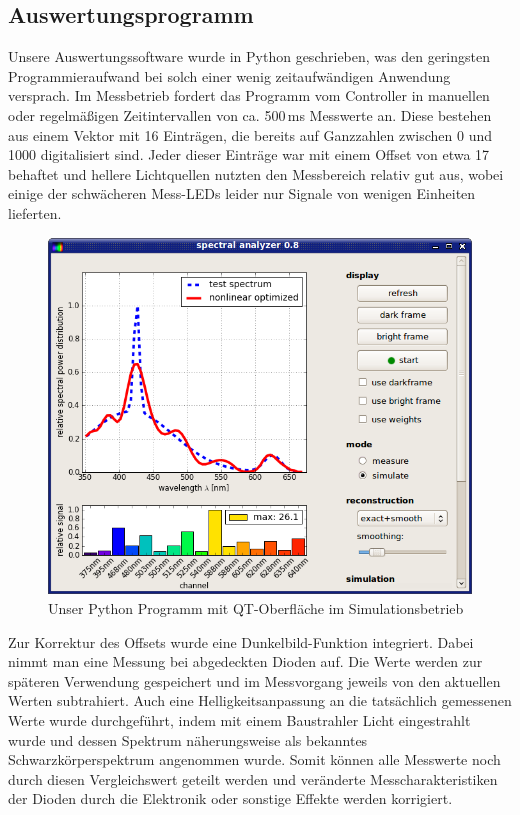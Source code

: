 \documentclass[11pt]{scrartcl}
\begin{document}
\subsection{Auswertungsprogramm} %
Unsere Auswertungssoftware wurde in Python geschrieben, was den geringsten Programmieraufwand bei solch einer wenig zeitaufwändigen Anwendung versprach.
Im Messbetrieb fordert das Programm vom Controller in manuellen oder regelmäßigen Zeitintervallen von ca. 500\,ms Messwerte an.
Diese bestehen aus einem Vektor mit 16 Einträgen, die bereits auf Ganzzahlen zwischen 0 und 1000 digitalisiert sind.
Jeder dieser Einträge war mit einem Offset von etwa 17 behaftet und hellere Lichtquellen nutzten den Messbereich relativ gut aus, wobei einige der schwächeren Mess-LEDs leider nur Signale von wenigen Einheiten lieferten.

\begin{figure}[H]
\begin{center}
\includegraphics[width=1.\textwidth]{screenshot.png}
\end{center}
\vspace{-1.5\baselineskip}
\caption{Unser Python Programm mit QT-Oberfläche im Simulationsbetrieb}
\label{fig:screenshot}
\end{figure}

Zur Korrektur des Offsets wurde eine Dunkelbild-Funktion integriert.
Dabei nimmt man eine Messung bei abgedeckten Dioden auf.
Die Werte werden zur späteren Verwendung gespeichert und im Messvorgang jeweils von den aktuellen Werten subtrahiert.
Auch eine Helligkeitsanpassung an die tatsächlich gemessenen Werte wurde durchgeführt, indem mit einem Baustrahler Licht eingestrahlt wurde und dessen Spektrum näherungsweise als bekanntes Schwarzkörperspektrum angenommen wurde.
Somit können alle Messwerte noch durch diesen Vergleichswert geteilt werden und veränderte Mess\-charakteristiken der Dioden durch die Elektronik oder sonstige Effekte werden korrigiert.
\end{document}

